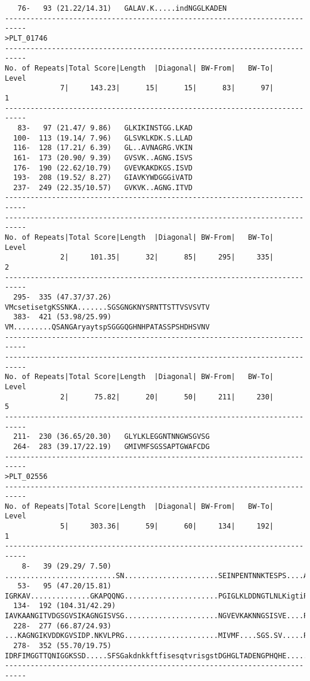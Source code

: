 \begin{verbatim}
   76-   93 (21.22/14.31)	GALAV.K.....indNGGLKADEN
---------------------------------------------------------------------------
>PLT_01746
---------------------------------------------------------------------------
No. of Repeats|Total Score|Length  |Diagonal| BW-From|   BW-To|   Level
             7|     143.23|      15|      15|      83|      97|       1
---------------------------------------------------------------------------
   83-   97 (21.47/ 9.86)	GLKIKINSTGG.LKAD
  100-  113 (19.14/ 7.96)	GLSVKLKDK.S.LLAD
  116-  128 (17.21/ 6.39)	GL..AVNAGRG.VKIN
  161-  173 (20.90/ 9.39)	GVSVK..AGNG.ISVS
  176-  190 (22.62/10.79)	GVEVKAKDKGS.ISVD
  193-  208 (19.52/ 8.27)	GIAVKYWDGGGiVATD
  237-  249 (22.35/10.57)	GVKVK..AGNG.ITVD
---------------------------------------------------------------------------
---------------------------------------------------------------------------
No. of Repeats|Total Score|Length  |Diagonal| BW-From|   BW-To|   Level
             2|     101.35|      32|      85|     295|     335|       2
---------------------------------------------------------------------------
  295-  335 (47.37/37.26)	VMcsetisetgKSSNKA.......SGSGNGKNYSRNTTSTTVSVSVTV
  383-  421 (53.98/25.99)	VM.........QSANGAryaytspSGGGQGHNHPATASSPSHDHSVNV
---------------------------------------------------------------------------
---------------------------------------------------------------------------
No. of Repeats|Total Score|Length  |Diagonal| BW-From|   BW-To|   Level
             2|      75.82|      20|      50|     211|     230|       5
---------------------------------------------------------------------------
  211-  230 (36.65/20.30)	GLYLKLEGGNTNNGWSGVSG
  264-  283 (39.17/22.19)	GMIVMFSGSSAPTGWAFCDG
---------------------------------------------------------------------------
>PLT_02556
---------------------------------------------------------------------------
No. of Repeats|Total Score|Length  |Diagonal| BW-From|   BW-To|   Level
             5|     303.36|      59|      60|     134|     192|       1
---------------------------------------------------------------------------
    8-   39 (29.29/ 7.50)	..........................SN......................SEINPENTNNKTESPS....ADDLK.....KRFKAG...SIP
   53-   95 (47.20/15.81)	IGRKAV..............GKAPQQNG......................PGIGLKLDDNGTLNLKigtiPD.LAD....KGFS........
  134-  192 (104.31/42.29)	IAVKAANGITVDGSGVSIKAGNGISVSG......................NGVEVKAKNNGSISVE....PDGIAV....KCWDGG...GIV
  228-  277 (66.87/24.93)	...KAGNGIKVDDKGVSIDP.NKVLPRG......................MIVMF....SGS.SV.....PEGWAL.....C.DGKdnrPNL
  278-  352 (55.70/19.75)	IDRFIMGGTTQNIGGKSSD.....SFSGakdnkkftfisesqtvrisgstDGHGLTADENGPHQHE.....QGETLnrqgKCHNG.......
---------------------------------------------------------------------------
\end{verbatim}